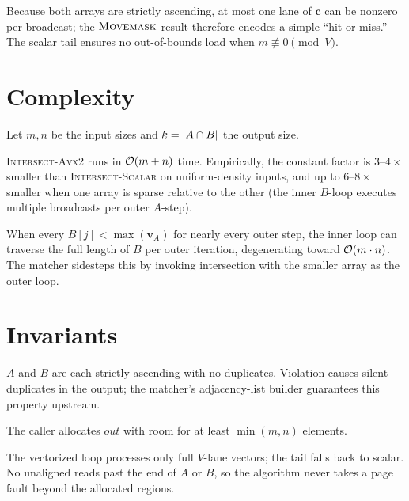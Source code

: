 \documentclass[11pt,openany]{book}
\begin{document}
Because both arrays are strictly ascending, at most one lane of
$\mathbf{c}$ can be nonzero per broadcast; the $\textsc{Movemask}$
result therefore encodes a simple ``hit or miss.'' The scalar tail
ensures no out-of-bounds load when $m \not\equiv 0 \pmod{V}$.

\section{Complexity}
\label{sec:simd:complexity}

Let $m, n$ be the input sizes and $k = \lvert A \cap B \rvert$ the output
size.

\begin{theorem}
\label{thm:simd:avx2}
\textsc{Intersect-Avx2} runs in $\mathcal{O}(m + n)$ time. Empirically,
the constant factor is $3$--$4\times$ smaller than
\textsc{Intersect-Scalar} on uniform-density inputs, and up to
$6$--$8\times$ smaller when one array is sparse relative to the
other (the inner $B$-loop executes multiple broadcasts per outer
$A$-step).
\end{theorem}

\begin{remark}
When every $B[j] < \max(\mathbf{v}_A)$ for nearly every outer step,
the inner loop can traverse the full length of $B$ per outer
iteration, degenerating toward $\mathcal{O}(m \cdot n)$. The matcher
sidesteps this by invoking intersection with the smaller array as
the outer loop.
\end{remark}

\section{Invariants}
\label{sec:simd:invariants}

\begin{invariant}
\label{inv:simd:sorted}
$A$ and $B$ are each strictly ascending with no duplicates.
Violation causes silent duplicates in the output; the matcher's
adjacency-list builder guarantees this property upstream.
\end{invariant}

\begin{invariant}
\label{inv:simd:capacity}
The caller allocates $\mathit{out}$ with room for at least
$\min(m, n)$ elements.
\end{invariant}

\begin{invariant}
\label{inv:simd:bounds}
The vectorized loop processes only full $V$-lane vectors; the tail
falls back to scalar. No unaligned  reads past the end
of $A$ or $B$, so the algorithm never takes a page fault beyond the
allocated regions.
\end{invariant}
\end{document}
